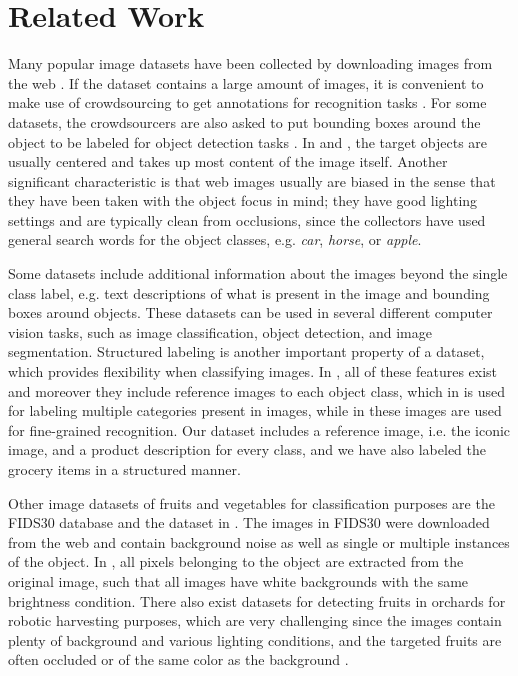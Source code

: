 

\section{Related Work}

Many popular image datasets have been collected by downloading images from the web . 
If the dataset contains a large amount of images, it is convenient to make use of crowdsourcing to get annotations for recognition tasks . For some datasets, the crowdsourcers are also asked to put bounding boxes around the object to be labeled for object detection tasks . In  and , the target objects are usually centered and takes up most content of the image itself. Another significant characteristic is that web images usually are biased in the sense that they have been taken with the object focus in mind; they have good lighting settings and are typically clean from occlusions, since the collectors have used general search words for the object classes, e.g. \textit{car}, \textit{horse}, or \textit{apple}.

Some datasets include additional information about the images beyond the single class label, e.g. text descriptions of what is present in the image and bounding boxes around objects. These datasets can be used in several different computer vision tasks, such as image classification, object detection, and image segmentation. Structured labeling is another important property of a dataset, which provides flexibility when classifying images. In  , all of these features exist and moreover they include reference images to each object class, which in  is used for labeling multiple  categories present in images, while in  these images are used for fine-grained recognition. 
Our dataset includes a reference image, i.e. the iconic image, and a product description for every class, and we have also labeled the grocery items in a structured manner.

Other image datasets of fruits and vegetables for classification purposes are the FIDS30 database  and the dataset in . The images in FIDS30 were downloaded from the web and contain background noise as well as single or multiple instances of the object. In , all pixels belonging to the object are extracted from the original image, such that all images have white backgrounds with the same brightness condition. There also exist datasets for detecting fruits in orchards for robotic harvesting purposes, which are very challenging since the images contain plenty of background and various lighting conditions, and the targeted fruits are often occluded or of the same color as the background .

